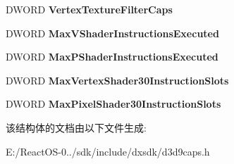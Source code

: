 \begin{DoxyCompactItemize}
D\+W\+O\+RD {\bfseries Vertex\+Texture\+Filter\+Caps}
\item 
\mbox{\label{struct___d3_d_c_a_p_s9_ac7b041cc1174185b8a238b0ac7e695be}} 
D\+W\+O\+RD {\bfseries Max\+V\+Shader\+Instructions\+Executed}
\item 
\mbox{\label{struct___d3_d_c_a_p_s9_a5e5109b1fc13af723cd08f4f3dd46a12}} 
D\+W\+O\+RD {\bfseries Max\+P\+Shader\+Instructions\+Executed}
\item 
\mbox{\label{struct___d3_d_c_a_p_s9_aafc775eebab8ee8884fc084e1ec2563d}} 
D\+W\+O\+RD {\bfseries Max\+Vertex\+Shader30\+Instruction\+Slots}
\item 
\mbox{\label{struct___d3_d_c_a_p_s9_aa92784ec252dd7959b3364e4af406096}} 
D\+W\+O\+RD {\bfseries Max\+Pixel\+Shader30\+Instruction\+Slots}
\end{DoxyCompactItemize}


该结构体的文档由以下文件生成\+:\begin{DoxyCompactItemize}
\item 
E\+:/\+React\+O\+S-\/0../sdk/include/dxsdk/d3d9caps.\+h\end{DoxyCompactItemize}
